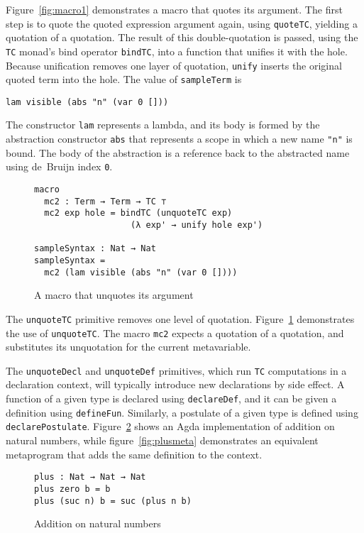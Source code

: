 \documentclass[sigplan,10pt]{acmart}
\begin{document}
Figure~\ref{fig:macro1} demonstrates a macro that quotes its argument.
The first step is to quote the quoted expression argument again, using \texttt{quoteTC}, yielding a quotation of a quotation.
The result of this double-quotation is passed, using the \texttt{TC} monad's bind operator \texttt{bindTC}, into a function that unifies it with the hole.
Because unification removes one layer of quotation, \texttt{unify} inserts the original quoted term into the hole.
The value of {\tt sampleTerm} is
\begin{center}
\begin{BVerbatim}
lam visible (abs "n" (var 0 []))
\end{BVerbatim}
\end{center}
The constructor \texttt{lam} represents a lambda, and its body is formed by the abstraction constructor \texttt{abs} that represents a scope in which a new name \texttt{"n"} is bound.
The body of the abstraction is a reference back to the abstracted name using de~Bruijn index \texttt{0}.

\begin{figure}
  \centering
\begin{Verbatim}
macro
  mc2 : Term → Term → TC ⊤
  mc2 exp hole = bindTC (unquoteTC exp) 
                   (λ exp' → unify hole exp')

sampleSyntax : Nat → Nat
sampleSyntax =
  mc2 (lam visible (abs "n" (var 0 [])))
\end{Verbatim}
  \caption{A macro that unquotes its argument}
  \label{fig:macro2}
\end{figure}

The {\tt unquoteTC} primitive removes one level of quotation.
Figure~\ref{fig:macro2} demonstrates the use of \texttt{unquoteTC}.
The macro {\tt mc2} expects a quotation of a quotation, and substitutes its unquotation for the current metavariable.


The {\tt unquoteDecl} and {\tt unquoteDef} primitives, which run \texttt{TC} computations in a declaration context, will typically introduce new declarations by side effect.
A function of a given type is declared using {\tt declareDef}, and it can be given a definition using {\tt defineFun}.
Similarly, a postulate of a given type is defined using {\tt declarePostulate}.
Figure~\ref{fig:plus} shows an Agda implementation of addition on natural numbers, while figure~\ref{fig:plusmeta} demonstrates an equivalent metaprogram that adds the same definition to the context.


\begin{figure}[h]
\begin{Verbatim}
plus : Nat → Nat → Nat
plus zero b = b
plus (suc n) b = suc (plus n b)
\end{Verbatim}
  \caption{Addition on natural numbers}
  \label{fig:plus}
\end{figure}
\end{document}
